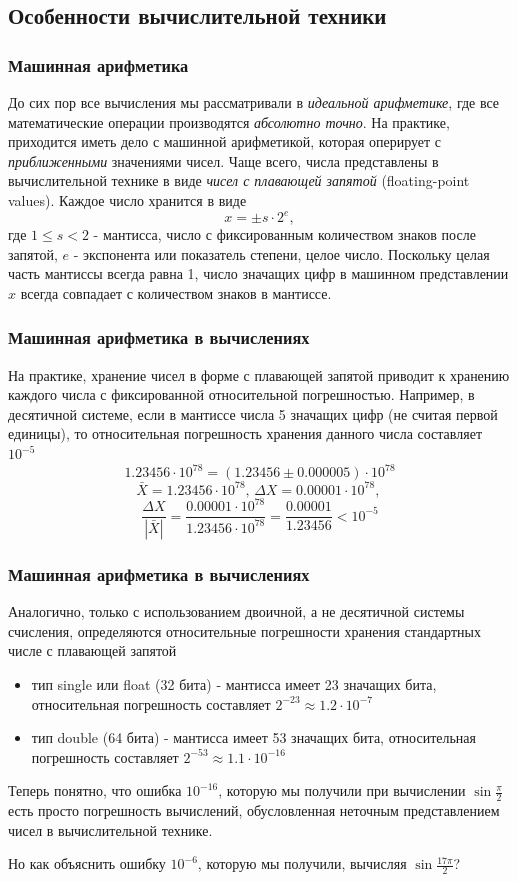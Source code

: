 \documentclass[aspectratio=43,unicode]{beamer}
\begin{document}
\subsection{Особенности вычислительной техники}
\begin{frame}
\frametitle{Машинная арифметика}
	До сих пор все вычисления мы рассматривали в \emph{идеальной арифметике}, где все математические
	операции производятся \emph{абсолютно точно}. На практике, приходится иметь дело с машинной арифметикой,
	которая оперирует с \emph{приближенными} значениями чисел. Чаще всего, числа представлены в
	вычислительной технике в виде \emph{чисел с плавающей запятой} (floating-point values). Каждое число хранится
	в виде
	\[
	x = \pm s \cdot 2^e,
	\]
	где $1 \leqslant s < 2$ - мантисса, число с фиксированным количеством знаков после запятой, $e$ - экспонента или показатель степени,
	целое число. Поскольку целая часть мантиссы всегда равна 1, число значащих цифр в машинном представлении $x$ всегда совпадает с
	количеством знаков в мантиссе.
\end{frame}

\begin{frame}
\frametitle{Машинная арифметика в вычислениях}
{
	На практике, хранение чисел в форме с плавающей запятой приводит к хранению каждого числа с фиксированной относительной погрешностью.
	Например, в десятичной системе, если в мантиссе числа 5 значащих цифр (не считая первой единицы),
	то относительная погрешность хранения данного числа составляет $10^{-5}$
	\[
	1.23456 \cdot 10^{78} = (1.23456 \pm 0.000005) \cdot 10^{78}
	\]
	\[
	\bar X = 1.23456 \cdot 10^{78}, \,
	\Delta X = 0.00001 \cdot 10^{78}, \,
	\]
	\[
	\frac{\Delta X}{|\bar X|} = \frac{0.00001\cdot 10^{78}}{1.23456\cdot 10^{78}} = \frac{0.00001}{1.23456} < 10^{-5}
	\]
}
\end{frame}

\begin{frame}
\frametitle{Машинная арифметика в вычислениях}
{
	Аналогично, только с использованием двоичной, а не десятичной системы счисления, определяются
	относительные погрешности хранения стандартных числе с плавающей запятой
	\begin{itemize}
		\item тип single или float (32 бита) - мантисса имеет 23 значащих бита,
		относительная погрешность составляет $2^{-23} \approx 1.2 \cdot 10^{-7}$
		\item тип double (64 бита) - мантисса имеет 53 значащих бита,
		относительная погрешность составляет $2^{-53} \approx 1.1 \cdot 10^{-16}$
	\end{itemize}

	\pause
	Теперь понятно, что ошибка $10^{-16}$, которую мы получили при вычислении $\sin \frac{\pi}{2}$ есть
	просто погрешность вычислений, обусловленная неточным представлением чисел в вычислительной технике.

	\pause
	Но как объяснить ошибку $10^{-6}$, которую мы получили, вычисляя $\sin \frac{17\pi}{2}$?
}
\end{frame}
\end{document}
